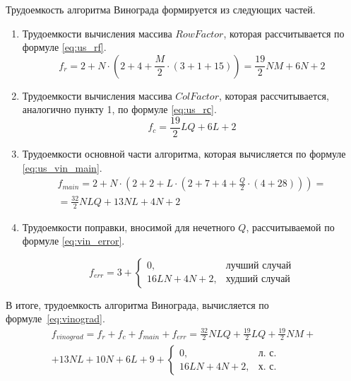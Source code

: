 Трудоемкость алгоритма Винограда формируется из следующих частей.
\begin{enumerate}
	\item Трудоемкости вычисления массива $RowFactor$, которая рассчитывается по формуле \eqref{eq:us_rf}.
	\begin{equation}
		\label{eq:us_rf}
		f_{r} = 2 + N \cdot (2 + 4 + \frac{M}{2} \cdot (3 + 1 + 15)) = \frac{19}{2}NM + 6N + 2
	\end{equation}
	\item Трудоемкости вычисления массива $ColFactor$, которая рассчитывается, аналогично пункту 1, по формуле \eqref{eq:us_rс}.
	\begin{equation}
		\label{eq:us_rс}
		f_{c} = \frac{19}{2}LQ + 6L + 2
	\end{equation}
	\item Трудоемкости основной части алгоритма, которая вычисляется по формуле \eqref{eq:us_vin_main}.
	\begin{equation}
		\label{eq:us_vin_main}
		\begin{gathered}
		f_{main} = 2 + N \cdot (2 + 2 + L \cdot (2 + 7 + 4 + \frac{Q}{2} \cdot (4 + 28))) = \\
		= \frac{32}{2} NLQ + 13NL + 4N + 2
		\end{gathered}
	\end{equation}
	
	\item Трудоемкости поправки, вносимой для нечетного $Q$, рассчитываемой по формуле \eqref{eq:vin_error}.
	
	\begin{equation}
		\label{eq:vin_error}
		f_{err} = 3 +
		\begin{cases}
			0, & \text{лучший случай}\\
			16LN + 4N + 2, & \text{худший случай}
		\end{cases}
	\end{equation}
	
\end{enumerate}

\clearpage

В итоге, трудоемкость алгоритма Винограда, вычисляется по формуле~\eqref{eq:vinograd}.
\begin{equation}
	\label{eq:vinograd}
	\begin{gathered}
		f_{vinograd} = f_{r} + f_{c} + f_{main} + f_{err} = \frac{32}{2}NLQ + \frac{19}{2}LQ + \frac{19}{2} NM + \\
		+ 13NL + 10N + 6L + 9 + 
		\begin{cases}
			0, & \text{л.~с.}\\
			16LN + 4N + 2, & \text{х.~с.}
		\end{cases}
	\end{gathered}
\end{equation}


